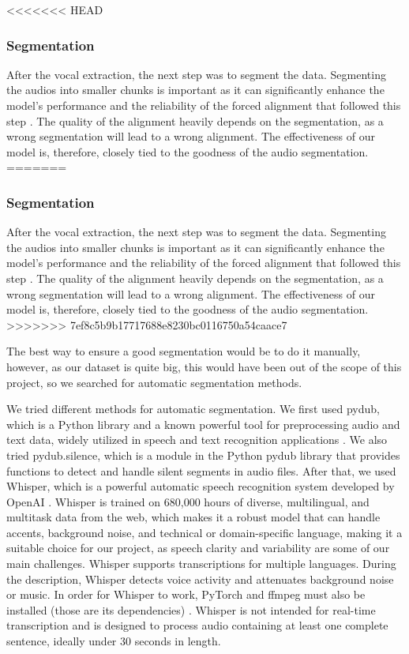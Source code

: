 \documentclass[a4paper]{article}
\begin{document}
<<<<<<< HEAD
\subsubsection{Segmentation}
After the vocal extraction, the next step was to segment the data. Segmenting the audios into smaller chunks is important as it can significantly enhance the model’s performance and the reliability of the forced alignment that followed this step \cite{Rybach2009}. The quality of the alignment heavily depends on the segmentation, as a wrong segmentation will lead to a wrong alignment. The effectiveness of our model is, therefore, closely tied to the goodness of the audio segmentation. 
=======
\subsubsection*{Segmentation}
After the vocal extraction, the next step was to segment the data. Segmenting the audios into smaller chunks is important as it can significantly enhance the model’s performance and the reliability of the forced alignment that followed this step \cite{Rybach2009}. The quality of the alignment heavily depends on the segmentation, as a wrong segmentation will lead to a wrong alignment. The effectiveness of our model is, therefore, closely tied to the goodness of the audio segmentation.
>>>>>>> 7ef8c5b9b17717688e8230bc0116750a54caace7

The best way to ensure a good segmentation would be to do it manually, however, as our dataset is quite big, this would have been out of the scope of this project, so we searched for automatic segmentation methods.

We tried different methods for automatic segmentation. We first used pydub, which is a Python library and a known powerful tool for preprocessing audio and text data, widely utilized in speech and text recognition applications \cite{Kulkarni2023}. We also tried pydub.silence, which is a module in the Python pydub library that provides functions to detect and handle silent segments in audio files. After that, we used Whisper, which is a powerful automatic speech recognition system developed by OpenAI \cite{OpenAI2022}. Whisper is trained on 680,000 hours of diverse, multilingual, and multitask data from the web, which makes it a robust model that can handle accents, background noise, and technical or domain-specific language, making it a suitable choice for our project, as speech clarity and variability are some of our main challenges. Whisper supports transcriptions for multiple languages. During the description, Whisper detects voice activity and attenuates background noise or music. In order for Whisper to work, PyTorch and ffmpeg must also be installed (those are its dependencies) \cite{Andreyev2025}. Whisper is not intended for real-time transcription and is designed to process audio containing at least one complete sentence, ideally under 30 seconds in length.
\end{document}
